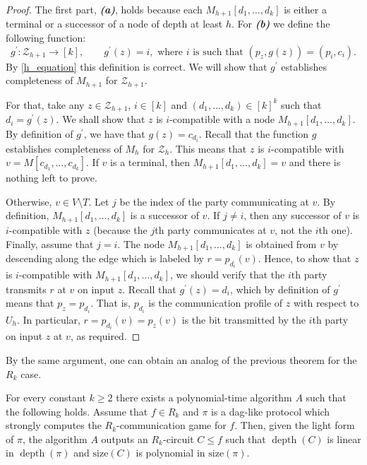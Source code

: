 \documentclass{toc}
\DeclareMathOperator{\depth}{depth}  %
\begin{document}
\begin{proof}
The first part, \textbf{\emph{(a)}}, holds because each $M_{h + 1}[d_1, \ldots, d_k]$ is either a terminal or a successor of a node of depth at least $h$. For \textbf{\emph{(b)}}  we define the following function:
\[g^\prime\colon\mathcal{Z}_{h + 1}\to [k], \qquad g^\prime(z) = i, \mbox{ where $i$ is such that } (p_z, g(z)) = (p_i, c_i).\]
By \eqref{h_equation} this definition is correct. We will show that $g^\prime$ establishes completeness  of $M_{h + 1}$ for $\mathcal{Z}_{h + 1}$.

For that, take any $z\in\mathcal{Z}_{h + 1}$,  $i\in [k]$ and  $(d_1, \ldots, d_k) \in [k]^k$ such that $d_i = g^\prime(z)$. We shall show that $z$ is $i$-compatible with a node $M_{h + 1}[d_1, \ldots, d_k]$. By definition of $g^\prime$, we have that $g(z) = c_{d_i}$. Recall that the function $g$ establishes completeness of $M_h$ for $\mathcal{Z}_h$. This means that $z$ is $i$-compatible with $v = M[c_{d_1}, \ldots, c_{d_k}]$. If $v$ is a terminal, then $M_{h+1}[d_1, \ldots, d_k] = v$ and there is nothing left to prove.

 Otherwise, $v\in V\setminus T$. Let $j$ be the index of the party communicating at $v$. By definition, $M_{h + 1}[d_1, \ldots, d_k]$ is a successor of $v$. If $j\neq i$, then any successor of $v$ is $i$-compatible with $z$ (because the $j$th party communicates at $v$, not the $i$th one). Finally, assume that $j = i$. The node $M_{h + 1}[d_1, \ldots, d_k]$ is obtained from $v$ by descending along the edge which is labeled by $r = p_{d_i}(v)$. Hence, to show that $z$ is $i$-compatible with $M_{h + 1}[d_1, \ldots, d_k]$, we should verify that the $i$th party transmits $r$ at $v$ on input $z$. Recall that $g^\prime(z) = d_i$, which by definition of $g^\prime$ means that $p_z = p_{d_i}$. That is, $p_{d_i}$ is the communication profile of $z$ with respect to $U_h$. In particular, $r = p_{d_i}(v) = p_z(v)$ is the bit transmitted by the $i$th party on input $z$ at $v$, as required.
\end{proof}

%
By    %
the same argument, one can obtain an analog of the previous theorem for the
%
$R_k$ case.   %
\begin{theorem}
\label{efficient_R_k}
For every constant $k\ge 2$ there exists  a polynomial-time algorithm $A$ such that the following holds. Assume that $f\in R_k$ and $\pi$ is a dag-like protocol which strongly computes  the $R_k$-communication game for $f$. Then, given the light form of $\pi$, the algorithm $A$ outputs an $R_k$-circuit $C \le f$ such that $\depth(C)$ is linear in $\depth(\pi)$ and $\mathrm{size}(C)$ is polynomial in $\mathrm{size}(\pi)$. 
\end{theorem}
\end{document}
